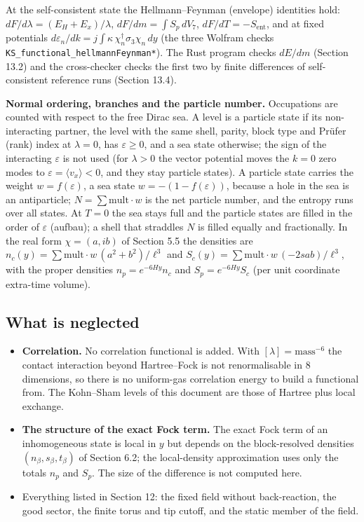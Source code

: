 \documentclass[11pt]{article}
\begin{document}
At the self-consistent state the Hellmann--Feynman (envelope) identities hold: $dF/d\lambda=(E_H+E_x)/\lambda$, $dF/dm=\int S_p\,dV_7$, $dF/dT=-S_{\mathrm{ent}}$, and at fixed potentials $d\varepsilon_n/dk=j\int\kappa\,\chi_n^\dagger\sigma_3\chi_n\,dy$ (the three Wolfram checks \texttt{KS\_funct\allowbreak{}ional\_he\allowbreak{}llmannFe\allowbreak{}ynman*}). The Rust program checks $dE/dm$ (Section 13.2) and the cross-checker checks the first two by finite differences of self-consistent reference runs (Section 13.4).

\textbf{Normal ordering, branches and the particle number.} Occupations are counted with respect to the free Dirac sea. A level is a particle state if its non-interacting partner, the level with the same shell, parity, block type and Prüfer (rank) index at $\lambda=0$, has $\varepsilon\ge0$, and a sea state otherwise; the sign of the interacting $\varepsilon$ is not used (for $\lambda>0$ the vector potential moves the $k=0$ zero modes to $\varepsilon=\langle v_x\rangle<0$, and they stay particle states). A particle state carries the weight $w=f(\varepsilon)$, a sea state $w=-(1-f(\varepsilon))$, because a hole in the sea is an antiparticle; $N=\sum\mathrm{mult}\cdot w$ is the net particle number, and the entropy runs over all states. At $T=0$ the sea stays full and the particle states are filled in the order of $\varepsilon$ (aufbau); a shell that straddles $N$ is filled equally and fractionally. In the real form $\chi=(a,ib)$ of Section 5.5 the densities are $n_c(y)=\sum\mathrm{mult}\cdot w\,(a^2+b^2)/\ell^3$ and $S_c(y)=\sum\mathrm{mult}\cdot w\,(-2sab)/\ell^3$, with the proper densities $n_p=e^{-6Hy}n_c$ and $S_p=e^{-6Hy}S_c$ (per unit coordinate extra-time volume).

\subsection{What is neglected}

\begin{itemize}
\item \textbf{Correlation.} No correlation functional is added. With $[\lambda]=\mathrm{mass}^{-6}$ the contact interaction beyond Hartree--Fock is not renormalisable in 8 dimensions, so there is no uniform-gas correlation energy to build a functional from. The Kohn--Sham levels of this document are those of Hartree plus local exchange.
\item \textbf{The structure of the exact Fock term.} The exact Fock term of an inhomogeneous state is local in $y$ but depends on the block-resolved densities $(n_\beta,s_\beta,t_\beta)$ of Section 6.2; the local-density approximation uses only the totals $n_p$ and $S_p$. The size of the difference is not computed here.
\item Everything listed in Section 12: the fixed field without back-reaction, the good sector, the finite torus and tip cutoff, and the static member of the field.
\end{itemize}
\end{document}
